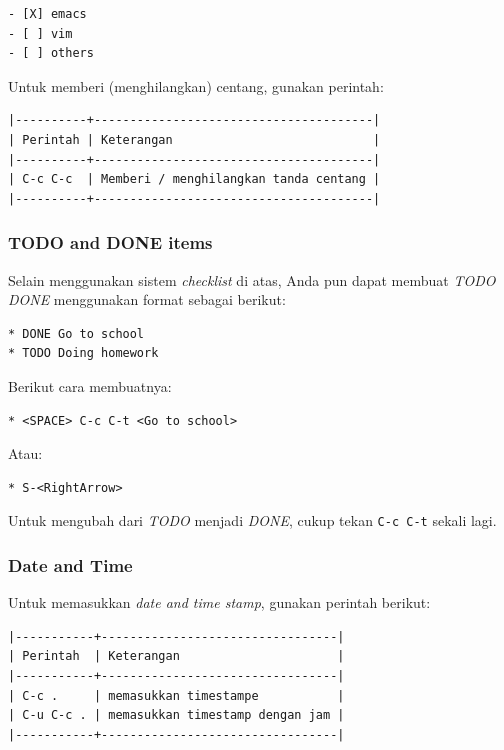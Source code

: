 \documentclass{article}
\begin{document}
\begin{verbatim}
- [X] emacs
- [ ] vim
- [ ] others
\end{verbatim}

Untuk memberi (menghilangkan) centang, gunakan perintah:

\begin{verbatim}
|----------+---------------------------------------|
| Perintah | Keterangan                            |
|----------+---------------------------------------|
| C-c C-c  | Memberi / menghilangkan tanda centang |
|----------+---------------------------------------|
\end{verbatim}

\subsubsection{TODO and DONE items}
Selain menggunakan sistem \emph{checklist} di atas, Anda pun dapat membuat
\emph{TODO DONE} menggunakan format sebagai berikut:

\begin{verbatim}
* DONE Go to school
* TODO Doing homework
\end{verbatim}

Berikut cara membuatnya:

\begin{verbatim}
* <SPACE> C-c C-t <Go to school>
\end{verbatim}

Atau:

\begin{verbatim}
* S-<RightArrow>
\end{verbatim}

Untuk mengubah dari \emph{TODO} menjadi \emph{DONE}, cukup tekan
\verb=C-c C-t= sekali lagi.

\subsubsection{Date and Time}
Untuk memasukkan \emph{date and time stamp}, gunakan perintah berikut:

\begin{verbatim}
|-----------+---------------------------------|
| Perintah  | Keterangan                      |
|-----------+---------------------------------|
| C-c .     | memasukkan timestampe           |
| C-u C-c . | memasukkan timestamp dengan jam |
|-----------+---------------------------------|
\end{verbatim}
\end{document}
